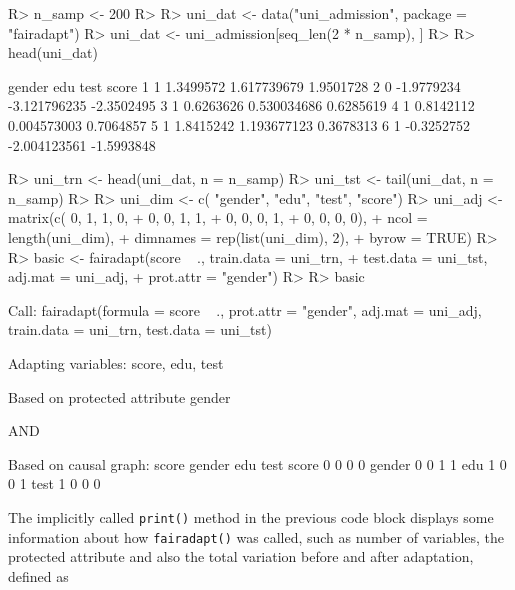 \documentclass[
  nojss]{jss}
\begin{document}
\begin{CodeChunk}
\begin{CodeInput}
R> n_samp <- 200
R> 
R> uni_dat <- data("uni_admission", package = "fairadapt")
R> uni_dat <- uni_admission[seq_len(2 * n_samp), ]
R> 
R> head(uni_dat)
\end{CodeInput}
\begin{CodeOutput}
  gender        edu         test      score
1      1  1.3499572  1.617739679  1.9501728
2      0 -1.9779234 -3.121796235 -2.3502495
3      1  0.6263626  0.530034686  0.6285619
4      1  0.8142112  0.004573003  0.7064857
5      1  1.8415242  1.193677123  0.3678313
6      1 -0.3252752 -2.004123561 -1.5993848
\end{CodeOutput}
\begin{CodeInput}
R> uni_trn <- head(uni_dat, n = n_samp)
R> uni_tst <- tail(uni_dat, n = n_samp)
R> 
R> uni_dim <- c(       "gender", "edu", "test", "score")
R> uni_adj <- matrix(c(       0,     1,      1,       0,
+                             0,     0,      1,       1,
+                             0,     0,      0,       1,
+                             0,     0,      0,       0),
+                   ncol = length(uni_dim),
+                   dimnames = rep(list(uni_dim), 2),
+                   byrow = TRUE)
R> 
R> basic <- fairadapt(score ~ ., train.data = uni_trn,
+                     test.data = uni_tst, adj.mat = uni_adj,
+                     prot.attr = "gender")
R> 
R> basic
\end{CodeInput}
\begin{CodeOutput}

Call:
fairadapt(formula = score ~ ., prot.attr = "gender", adj.mat = uni_adj, 
    train.data = uni_trn, test.data = uni_tst)


Adapting variables:
  score, edu, test

Based on protected attribute gender 

  AND

Based on causal graph:
       score gender edu test
score      0      0   0    0
gender     0      0   1    1
edu        1      0   0    1
test       1      0   0    0
\end{CodeOutput}
\end{CodeChunk}

The implicitly called \texttt{print()} method in the previous code block
displays some information about how \texttt{fairadapt()} was called,
such as number of variables, the protected attribute and also the total
variation before and after adaptation, defined as
\end{document}
